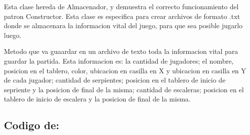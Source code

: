 \documentclass[letterpaper,10pt,english]{sphinxmanual}
\begin{document}

\begin{fulllineitems}
\label{\detokenize{codigo:almacenador.AlmacenadorTXT}}
Esta clase hereda de Almacenador, y demuestra el correcto funcionamiento del patron Constructor. Esta clase es especifica
para crear archivos de formato .txt donde se almacenara la informacion vital del juego, para que sea posible jugarlo luego.

\begin{fulllineitems}
\label{\detokenize{codigo:almacenador.AlmacenadorTXT.guardar}}
Metodo que va guaardar en un archivo de texto toda la informacion vital para guardar la partida. Esta informacion es: la
cantidad de jugadores; el nombre, posicion en el tablero, color, ubicacion en casilla en X y ubicacion en casilla en Y de 
cada jugador; cantidad de serpientes; posicion en el tablero de inicio de sepriente y la posicion de final de la misma; 
cantidad de escaleras; posicion en el tablero de inicio de escalera y la posicion de final de la misma.

\end{fulllineitems}


\end{fulllineitems}



\subsection{Codigo de: }
\label{\detokenize{codigo:module-button}}\label{\detokenize{codigo:codigo-de-boton}}
\end{document}

